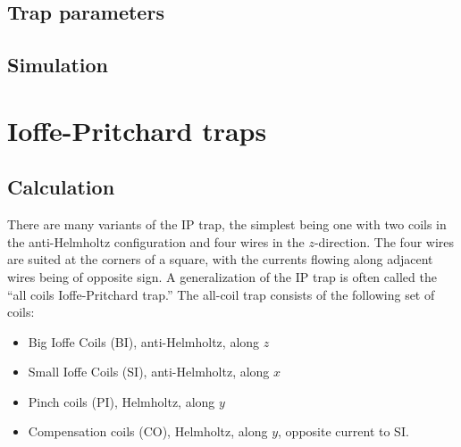 \documentclass{article}
\theoremstyle{definition}
\begin{document}
\subsection{Trap parameters}

\subsection{Simulation}


\section{Ioffe-Pritchard traps}



\subsection{Calculation}


There are many variants of the IP trap, the simplest being one with two coils in the anti-Helmholtz configuration and four wires in the $z$-direction. The four wires are suited at the corners of a square, with the currents flowing along adjacent wires being of opposite sign. A generalization of the IP trap is often called the ``all coils Ioffe-Pritchard trap.'' The all-coil trap consists of the following set of coils:
\begin{itemize}
	\item Big Ioffe Coils (BI), anti-Helmholtz, along $z$
	\item Small Ioffe Coils (SI), anti-Helmholtz, along $x$
	\item Pinch coils (PI), Helmholtz, along $y$
	\item Compensation coils (CO), Helmholtz, along $y$, opposite current to SI.
\end{itemize}
\end{document}
